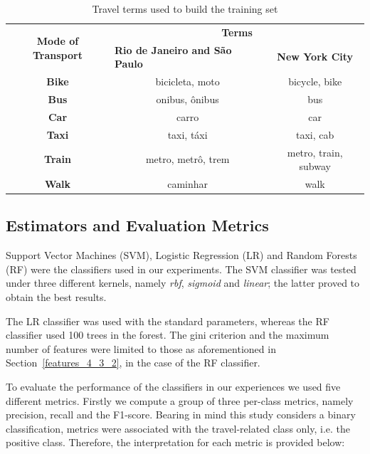 \begin{table}[htbp]
	\centering
	\small
	\caption{Travel terms used to build the training set}
	\label{tab:terms}
	\begin{tabular}{c|c|c}
		\hline
		\multirow{2}{*}{\textbf{Mode of Transport}} & \multicolumn{2}{c|}{\textbf{Terms}} \\ \cline{2-3} 
		& \multicolumn{1}{l|}{\textbf{Rio de Janeiro and São Paulo}} & \textbf{New York City} \\ \hline
		\textbf{Bike} & bicicleta, moto & bicycle, bike \\
		\textbf{Bus} & onibus, ônibus & bus \\
		\textbf{Car} & carro & car \\
		\textbf{Taxi} & taxi, táxi & taxi, cab \\
		\textbf{Train} & metro, metrô, trem & metro, train, subway \\
		\textbf{Walk} & caminhar & walk \\ \hline
	\end{tabular}
\end{table}

\subsection{Estimators and Evaluation Metrics}
Support Vector Machines (SVM), Logistic Regression (LR) and Random Forests (RF) were the classifiers used in our experiments. The SVM classifier was tested under three different kernels, namely \textit{rbf}, \textit{sigmoid} and \textit{linear}; the latter proved to obtain the best results. 

The LR classifier was used with the standard parameters, whereas the RF classifier used 100 trees in the forest. The gini criterion and the maximum number of features were limited to those as aforementioned in Section~\ref{features_4_3_2}, in the case of the RF classifier.

To evaluate the performance of the classifiers in our experiences we used five different metrics. Firstly we compute a group of three per-class metrics, namely precision, recall and the F1-score. Bearing in mind this study considers a binary classification, metrics were associated with the travel-related class only, i.e. the positive class. Therefore, the interpretation for each metric is provided below:

